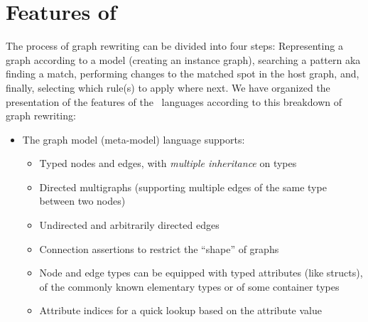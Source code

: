 \section{Features of \GrG}

The process of graph rewriting can be divided into four steps:
Representing a graph according to a model (creating an instance graph),
searching a pattern aka finding a match,
performing changes to the matched spot in the host graph,
and, finally, selecting which rule(s) to apply where next.
We have organized the presentation of the features of the \GrG\ languages according to this breakdown of graph rewriting:

\begin{itemize}
  \item The graph model (meta-model) language supports:
  \begin{itemize}
    \item Typed nodes and edges, with \emph{multiple inheritance} on types
    \item Directed multigraphs (supporting multiple edges of the same type between two nodes)
    \item Undirected and arbitrarily directed edges
    \item Connection assertions to restrict the ``shape'' of graphs
    \item Node and edge types can be equipped with typed attributes (like structs), of the commonly known elementary types or of some container types
    \item Attribute indices for a quick lookup based on the attribute value
  \end{itemize}


\end{itemize}
